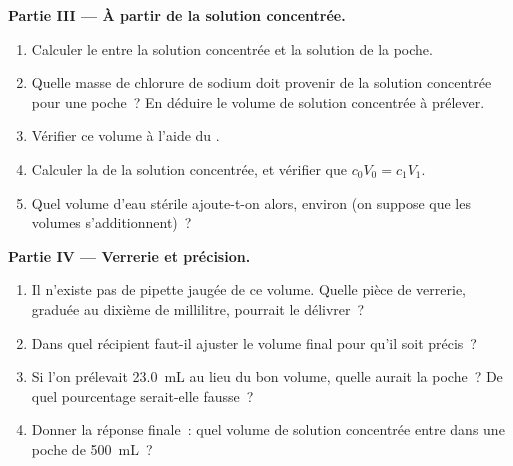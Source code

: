 \begin{problem}
\medskip
\noindent\textbf{Partie III --- À partir de la solution concentrée.}
\begin{enumerate}[resume]
  \item Calculer le  entre la solution concentrée et
        la solution de la poche.
  \item Quelle masse de chlorure de sodium doit provenir de la solution
        concentrée pour une poche~? En déduire le volume de solution
        concentrée à prélever.
  \item Vérifier ce volume à l'aide du .
  \item Calculer la  de la solution concentrée, et
        vérifier que $c_0 V_0 = c_1 V_1$.
  \item Quel volume d'eau stérile ajoute-t-on alors, environ (on suppose
        que les volumes s'additionnent)~?
\end{enumerate}

\medskip
\noindent\textbf{Partie IV --- Verrerie et précision.}
\begin{enumerate}[resume]
  \item Il n'existe pas de pipette jaugée de ce volume. Quelle pièce de
        verrerie, graduée au dixième de millilitre, pourrait le
        délivrer~?
  \item Dans quel récipient faut-il ajuster le volume final pour qu'il
        soit précis~?
  \item Si l'on prélevait \qty{23.0}{mL} au lieu du bon volume, quelle
         aurait la poche~? De quel pourcentage
        serait-elle fausse~?
  \item Donner la réponse finale~: quel volume de solution concentrée
        entre dans une poche de \qty{500}{mL}~?
\end{enumerate}
\end{problem}

